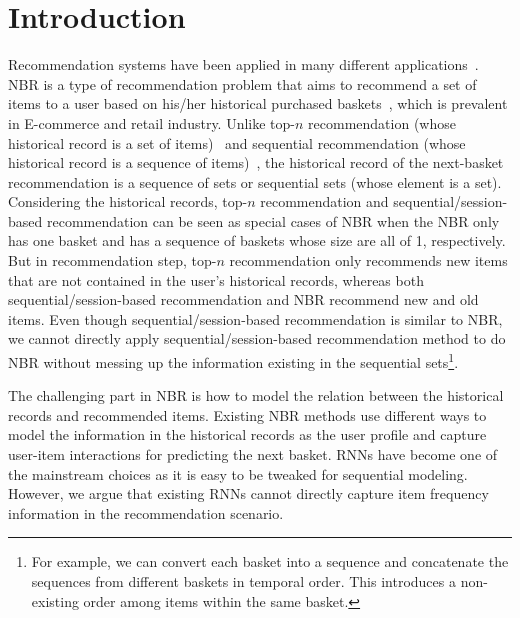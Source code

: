 \documentclass[sigconf]{acmart}
\begin{document}



\maketitle

\section{Introduction}

Recommendation systems have  been applied in many different  applications~\cite{aggarwal2016recommender}. NBR is a  type of  recommendation  problem that aims to recommend a set  of items to a user based on his/her  historical  purchased  baskets~\cite{rendle2010factorizing}\cite{ying2018sequential}\cite{wang2015learning}\cite{yu2016dynamic}, which is prevalent in E-commerce and retail industry.  Unlike top-$n$  recommendation (whose historical  record is a set of items)~\cite{ning2015comprehensive} and sequential recommendation (whose historical record is a sequence of items)~\cite{ludewig2019performance}, the historical record of the next-basket  recommendation is a sequence of sets or sequential sets (whose element is a set). Considering the historical  records, top-$n$  recommendation and sequential/session-based recommendation can be seen as special cases of NBR when the NBR only has one  basket and has a sequence  of baskets whose size are all of 1, respectively. But in recommendation step, top-$n$ recommendation only recommends  new items that are not  contained in the user's historical records,  whereas both  sequential/session-based  recommendation and NBR  recommend new and old items. Even though sequential/session-based recommendation is similar to NBR, we cannot directly  apply  sequential/session-based  recommendation method to do  NBR without messing up the  information  existing in the  sequential  sets\footnote{For example, we can convert each basket into a sequence and concatenate the sequences from different baskets in temporal order. This  introduces a non-existing order among items within the same basket.}.

The challenging part in NBR is how to model the relation between the  historical records and recommended  items. Existing NBR methods use  different ways to  model the information in the  historical records as the  user profile and capture user-item  interactions for predicting the next basket. RNNs have become one of the mainstream choices as it is easy to be  tweaked for sequential modeling.  However, we argue that existing RNNs  cannot directly capture item frequency  information in the recommendation  scenario. 
\end{document}
